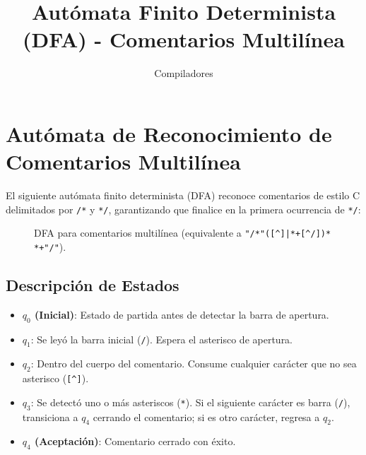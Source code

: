 \documentclass{article}
\title{Autómata Finito Determinista (DFA) - Comentarios Multilínea}
\author{Compiladores}
\date{}
\begin{document}
\maketitle

\section{Autómata de Reconocimiento de Comentarios Multilínea}

El siguiente autómata finito determinista (DFA) reconoce comentarios de estilo C delimitados por \texttt{/*} y \texttt{*/}, garantizando que finalice en la primera ocurrencia de \texttt{*/}:

\begin{figure}[htbp]
\centering
{}
\caption{DFA para comentarios multilínea (equivalente a \texttt{"/*"([\textasciicircum *]|*+[\textasciicircum */])* *+"/"}).}
\label{fig:automata_comentarios}
\end{figure}

\subsection{Descripción de Estados}
\begin{itemize}
    \item \textbf{$q_0$ (Inicial)}: Estado de partida antes de detectar la barra de apertura.
    \item \textbf{$q_1$}: Se leyó la barra inicial (\texttt{/}). Espera el asterisco de apertura.
    \item \textbf{$q_2$}: Dentro del cuerpo del comentario. Consume cualquier carácter que no sea asterisco (\texttt{[\textasciicircum *]}).
    \item \textbf{$q_3$}: Se detectó uno o más asteriscos (\texttt{*}). Si el siguiente carácter es barra (\texttt{/}), transiciona a $q_4$ cerrando el comentario; si es otro carácter, regresa a $q_2$.
    \item \textbf{$q_4$ (Aceptación)}: Comentario cerrado con éxito.
\end{itemize}
\end{document}
